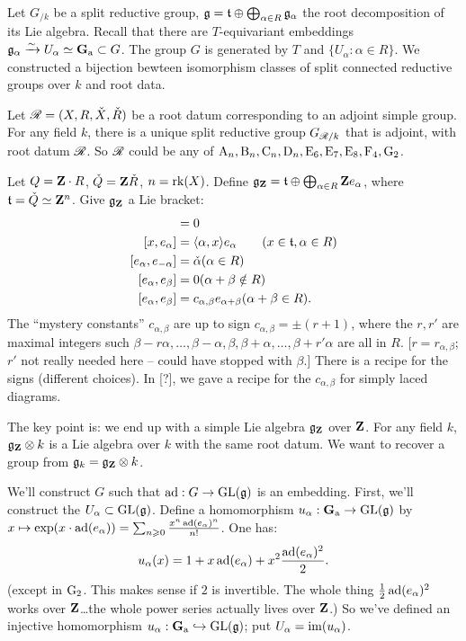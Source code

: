 Let $G_{/k}$ be a split reductive group, 
$\mathfrak{g}=\mathfrak{t}\oplus \bigoplus_{\alpha\in R} \mathfrak{g}_\alpha$ the root decomposition of 
its Lie algebra. Recall that there are $T$-equivariant embeddings 
$\mathfrak{g}_\alpha\xrightarrow\sim U_\alpha\simeq \mathbf{G}_\mathrm{a}\subset G$. The group $G$ is generated by 
$T$ and $\{U_\alpha:\alpha\in R\}$. We constructed a bijection bewteen 
isomorphism classes of split connected reductive groups over $k$ and 
root data. 

Let $\mathscr{R}=(X,R,\check X,\check R)$ be a root datum corresponding to an 
adjoint simple group. For any field $k$, there is a unique split reductive 
group $G_{\mathscr{R}/k}$ that is adjoint, with root datum $\mathscr{R}$. So $\mathscr{R}$ could be 
any of 
$\mathrm{A}_n,\mathrm{B}_n,\mathrm{C}_n,\mathrm{D}_n,\mathrm{E}_6,\mathrm{E}_7,\mathrm{E}_8,\mathrm{F}_4,\mathrm{G}_2$. 

Let $Q=\mathbf{Z}\cdot R$, $\check Q=\mathbf{Z} \check R$, $n=\operatorname{rk}(X)$. Define 
$\mathfrak{g}_{\mathbf{Z}} = \mathfrak{t}\oplus \bigoplus_{\alpha\in R} \mathbf{Z} e_\alpha$, where 
$\mathfrak{t}=\check Q\simeq \mathbf{Z}^n$. Give $\mathfrak{g}_{\mathbf{Z}}$ a Lie bracket: 
\begin{align*}
  [\ft,\ft] &= 0 \\
  [x,e_\alpha] &= \langle \alpha,x\rangle e_\alpha \qquad (x\in \ft,\alpha\in R) \\
  [e_\alpha,e_{-\alpha}] &= \check\alpha (\alpha\in R) \\
  [e_\alpha,e_\beta] &= 0 (\alpha+\beta\notin R) \\
  [e_\alpha,e_\beta] &= c_{\alpha,\beta} e_{\alpha+\beta} (\alpha+\beta\in R) .
\end{align*}
The ``mystery constants'' $c_{\alpha,\beta}$ are up to sign 
$c_{\alpha,\beta}=\pm(r+1)$, where the $r,r'$ are maximal integers such 
$\beta-r\alpha,\dots,\beta-\alpha,\beta,\beta+\alpha,\dots,\beta+r'\alpha$ are 
all in $R$. [$r=r_{\alpha,\beta}$; $r'$ not really needed here -- could have 
stopped with $\beta$.] There is a recipe for the signs (different choices). 
In [?], we gave a recipe for the $c_{\alpha,\beta}$ for simply laced diagrams. 

The key point is: we end up with a simple Lie algebra $\mathfrak{g}_{\mathbf{Z}}$ over $\mathbf{Z}$. 
For any field $k$, $\mathfrak{g}_{\mathbf{Z}}\otimes k$ is a Lie algebra over $k$ with the same 
root datum. We want to recover a group from $\mathfrak{g}_k=\mathfrak{g}_{\mathbf{Z}}\otimes k$. 

We'll construct $G$ such that $\operatorname{ad}:G\to \operatorname{GL}(\mathfrak{g})$ is an embedding. First, 
we'll construct the $U_\alpha\subset \operatorname{GL}(\mathfrak{g})$. Define a homomorphism 
$u_\alpha:\mathbf{G}_\mathrm{a}\to \operatorname{GL}(\mathfrak{g})$ by $x\mapsto \exp(x\cdot \operatorname{ad}(e_\alpha)) = \sum_{n\geqslant 0} \frac{x^n\operatorname{ad}(e_\alpha)^n}{n!}$. One has: 
\[
  u_\alpha(x) = 1+x\operatorname{ad}(e_\alpha) + x^2\frac{\operatorname{ad}(e_\alpha)^2}{2} .
\]
(except in $\mathrm{G}_2$. This makes sense if $2$ is invertible. The whole thing 
$\frac 1 2 \operatorname{ad}(e_\alpha)^2$ works over $\mathbf{Z}$\ldots the whole power series 
actually lives over $\mathbf{Z}$.) So we've defined an injective homomorphism 
$u_\alpha:\mathbf{G}_\mathrm{a}\hookrightarrow \operatorname{GL}(\mathfrak{g})$; put $U_\alpha=\operatorname{im}(u_\alpha)$. 


